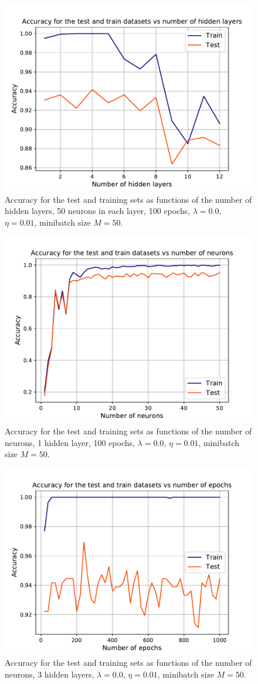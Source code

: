\documentclass{emulateapj}
\begin{document}
\begin{figure}[h]
    \centering
    \includegraphics[width=.49\textwidth]{Figures/Class_hidden_layers.pdf}
    \caption{Accuracy for the test and training sets as functions of the number of hidden layers, 50 neurons in each layer, 100 epochs, $\lambda=0.0$, $\eta=0.01$, minibatch size $M=50$.}
    \label{fig:accuracy vs hidden layers}
\end{figure}

\begin{figure}[h]
    \centering
    \includegraphics[width=.49\textwidth]{Figures/Class_hidden_neurons.pdf}
    \caption{Accuracy for the test and training sets as functions of the number of neurons, 1 hidden layer, 100 epochs, $\lambda=0.0$, $\eta=0.01$, minibatch size $M=50$.}
    \label{fig:accuracy vs num neurons}
\end{figure}

\begin{figure}[h]
    \centering
    \includegraphics[width=.49\textwidth]{Figures/Class_epochs_number.pdf}
    \caption{Accuracy for the test and training sets as functions of the number of neurons, 3 hidden layers, $\lambda=0.0$, $\eta=0.01$, minibatch size $M=50$.}
    \label{fig:accuracy vs num epochs}
\end{figure}
\end{document}
